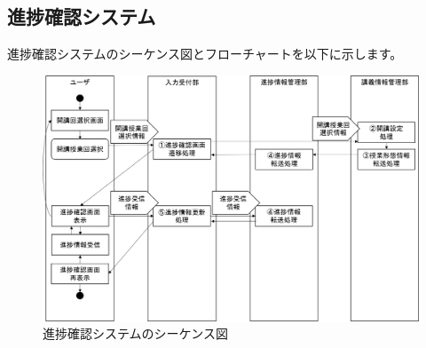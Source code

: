 \newpage
\subsection{進捗確認システム}
進捗確認システムのシーケンス図とフローチャートを以下に示します。

\begin{figure}[htbp]
  \begin{center}
    \includegraphics[width=1\linewidth,clip]{./img/preg_check/main.png}
    \caption{進捗確認システムのシーケンス図}\label{fig:preg_checkseaquence}
  \end{center}
\end{figure}

